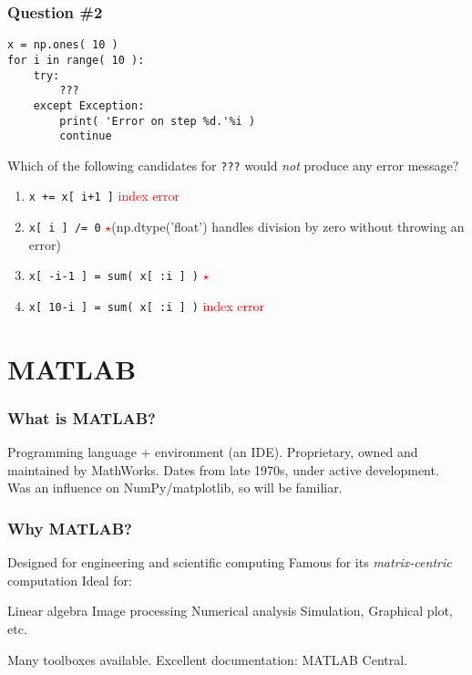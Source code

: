 \documentclass[11pt]{beamer}
\newcommand{\correctstar}{{\Large\textcolor{red}{$\star$}}}
\begin{document}
\begin{frame}[fragile]
  \frametitle{Question \#2}
  \Enlarge

  \begin{Verbatim}
x = np.ones( 10 )
for i in range( 10 ):
    try:
        ???
    except Exception:
        print( 'Error on step %d.'%i )
        continue
  \end{Verbatim}

Which of the following candidates for \texttt{???} would \emph{not} produce any error message?

  \begin{enumerate}[label=\Alph*]
    \item  \texttt{x += x[ i+1 ]}  \textcolor{red}{index error}
    \item  \texttt{x[ i ] /= 0}  \correctstar (np.dtype('float') handles division by zero without throwing an error)
    \item  \texttt{x[ -i-1 ]   = sum( x[ :i ] )}  \correctstar
    \item  \texttt{x[ 10-i ] = sum( x[ :i ] )}  \textcolor{red}{index error}
  \end{enumerate}
\end{frame}

\section{MATLAB}

\begin{frame}[fragile]
  \frametitle{What is MATLAB?}
  \Enlarge

  \begin{enumerate}
  \myitem  Programming language + environment (an IDE).
  \myitem  Proprietary, owned and maintained by MathWorks.
  \myitem  Dates from late 1970s, under active development.
  \myitem  Was an influence on NumPy/matplotlib, so will be familiar.
  \end{enumerate}
\end{frame}


\begin{frame}[fragile]
  \frametitle{Why MATLAB?}
  \Enlarge

  \begin{enumerate}
  \myitem  Designed for engineering and scientific computing
  \myitem  Famous for its \emph{matrix-centric} computation
  \myitem  Ideal for:
    \begin{enumerate}
    \mysubitem  Linear algebra
    \mysubitem  Image processing
    \mysubitem  Numerical analysis
    \mysubitem  Simulation, Graphical plot, etc.
    \end{enumerate}
  \myitem  Many toolboxes available.
  \myitem  Excellent documentation:  MATLAB Central.
  \end{enumerate}
\end{frame}
\end{document}
